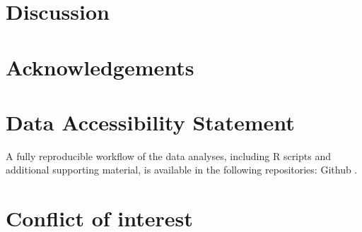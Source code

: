 \documentclass[12pt]{article}
\begin{document}
\vspace{20px}









\vspace{20px}


\section*{\normalsize Discussion}


\vspace{20px}


\vspace{20px}

\section*{\normalsize Acknowledgements}

\section*{\normalsize Data Accessibility Statement}%

A fully reproducible workflow of the data analyses, including R scripts and additional supporting material, is available in the following repositories: Github \url{}.

\section*{\normalsize Conflict of interest}%
\end{document}
